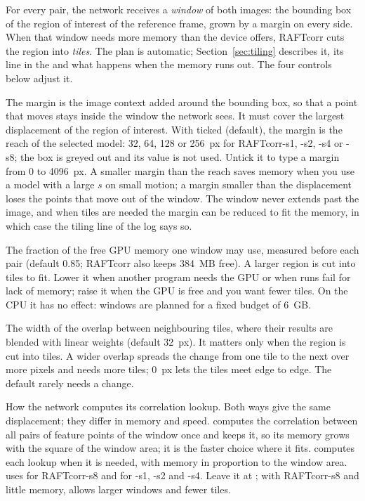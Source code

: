 For every pair, the network receives a \emph{window} of both images: the bounding box of the
region of interest of the reference frame, grown by a margin on every side. When that window
needs more memory than the device offers, RAFTcorr cuts the region into \emph{tiles}. The plan is
automatic; Section~\ref{sec:tiling} describes it, its line in the  and what happens when the
memory runs out. The four controls below adjust it.

\begin{description}[leftmargin=1.2cm,style=nextline]
  \item[Margin and Use the Model Reach]
    The margin is the image context added around the bounding box, so that a point that moves
    stays inside the window the network sees. It must cover the largest displacement of the
    region of interest. With  ticked (default), the margin is the reach
    of the selected model: 32, 64, 128 or 256~px for RAFTcorr-s1, -s2, -s4 or -s8; the box is
    greyed out and its value is not used. Untick it to type a margin from 0 to 4096~px. A
    smaller margin than the reach saves memory when you use a model with a large $s$ on small
    motion; a margin smaller than the displacement loses the points that move out of the
    window. The window never extends past the image, and when tiles are needed the margin can
    be reduced to fit the memory, in which case the tiling line of the log says so.
  \item[GPU Memory]
    The fraction of the free GPU memory one window may use, measured before each pair (default
    0.85; RAFTcorr also keeps 384~MB free). A larger region is cut into tiles to fit. Lower it
    when another program needs the GPU or when runs fail for lack of memory; raise it when the
    GPU is free and you want fewer tiles. On the CPU it has no effect: windows are planned for a
    fixed budget of 6~GB.
  \item[Tile Blending]
    The width of the overlap between neighbouring tiles, where their results are blended with
    linear weights (default 32~px). It matters only when the region is cut into tiles. A wider
    overlap spreads the change from one tile to the next over more pixels and needs more tiles;
    0~px lets the tiles meet edge to edge. The default rarely needs a change.
  \item[Correlation]
    How the network computes its correlation lookup. Both ways give the same displacement; they
    differ in memory and speed.  computes the correlation between all pairs of
    feature points of the window once and keeps it, so its memory grows with the square of the
    window area; it is the faster choice where it fits.  computes each lookup when it is needed,
    with memory in proportion to the window area.  uses  for
    RAFTcorr-s8 and  for -s1, -s2 and -s4. Leave it at ; with
    RAFTcorr-s8 and little memory,  allows larger windows and fewer tiles.
\end{description}
